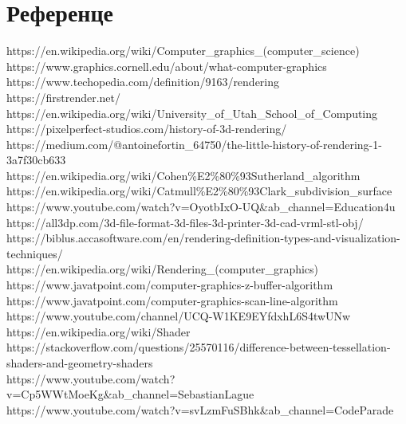 \documentclass[12pt]{article}
\begin{document}
	\pagebreak

	\section{Референце}
	https://en.wikipedia.org/wiki/Computer\_graphics\_(computer\_science)\\
	https://www.graphics.cornell.edu/about/what-computer-graphics\\
	https://www.techopedia.com/definition/9163/rendering\\
	https://firstrender.net/\\
	https://en.wikipedia.org/wiki/University\_of\_Utah\_School\_of\_Computing\\
	https://pixelperfect-studios.com/history-of-3d-rendering/\\
	https://medium.com/@antoinefortin\_64750/the-little-history-of-rendering-1-3a7f30cb633\\
	https://en.wikipedia.org/wiki/Cohen\%E2\%80\%93Sutherland\_algorithm\\
	https://en.wikipedia.org/wiki/Catmull\%E2\%80\%93Clark\_subdivision\_surface\\
	https://www.youtube.com/watch?v=OyotbIxO-UQ\&ab\_channel=Education4u\\
	https://all3dp.com/3d-file-format-3d-files-3d-printer-3d-cad-vrml-stl-obj/\\
	https://biblus.accasoftware.com/en/rendering-definition-types-and-visualization-techniques/\\
	https://en.wikipedia.org/wiki/Rendering\_(computer\_graphics)\\
	https://www.javatpoint.com/computer-graphics-z-buffer-algorithm\\
	https://www.javatpoint.com/computer-graphics-scan-line-algorithm\\
	https://www.youtube.com/channel/UCQ-W1KE9EYfdxhL6S4twUNw\\
	https://en.wikipedia.org/wiki/Shader\\
	https://stackoverflow.com/questions/25570116/difference-between-tessellation-shaders-and-geometry-shaders\\
	https://www.youtube.com/watch?v=Cp5WWtMoeKg\&ab\_channel=SebastianLague\\
	https://www.youtube.com/watch?v=svLzmFuSBhk\&ab\_channel=CodeParade\\
	
\end{document}
